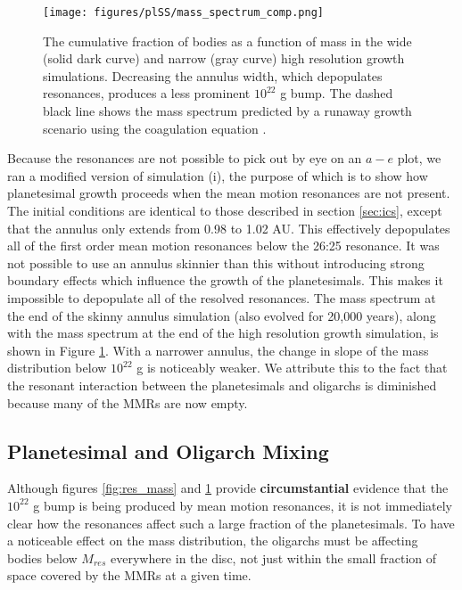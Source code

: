 \begin{figure}
    \begin{centering}
    \texttt{[image: figures/plSS/mass\_spectrum\_comp.png]}
    \caption{The cumulative fraction of bodies as a function of mass in the wide (solid dark curve) and narrow (gray curve) high 
    resolution growth simulations. Decreasing the annulus width, which depopulates resonances, produces a less prominent 
    $10^{22}$ g bump. The dashed black line shows the mass spectrum predicted  by a runaway growth scenario using the coagulation equation \cite{mcleod62, trubnikov71}.}
    \end{centering}
    \label{fig:mass_spectrum_comp}
\end{figure}
Because the resonances are not possible to pick out by eye on an $a-e$ plot, we ran a modified version of simulation (i), the 
purpose of which is to show how planetesimal growth proceeds when the mean motion resonances are not present. The initial 
conditions are identical to those described in section \ref{sec:ics}, except that the annulus only extends from 0.98 to 1.02 AU. 
This effectively depopulates all of the first order mean motion resonances below the 26:25 resonance. It was not possible to use 
an annulus skinnier than this without introducing strong boundary effects which influence the growth of the planetesimals. This 
makes it impossible to depopulate all of the resolved resonances. The mass spectrum at the end of the skinny annulus 
simulation (also evolved for 20,000 years), along with the mass spectrum at the end of the high resolution growth simulation, is 
shown in Figure \ref{fig:mass_spectrum_comp}. With a narrower annulus, the change in slope of the mass distribution below 
$10^{22}$ g is noticeably weaker. We attribute this to the fact that the resonant interaction between the planetesimals and 
oligarchs is diminished because many of the MMRs are now empty.

\subsection{Planetesimal and Oligarch Mixing}\label{sec:mix}

Although figures \ref{fig:res_mass} and \ref{fig:mass_spectrum_comp} provide \textbf{circumstantial} evidence that the $10^{22}$ g bump is 
being produced by mean motion resonances, it is not immediately clear how the resonances affect such a large fraction of the 
planetesimals. To have a noticeable effect on the mass distribution, the oligarchs must be affecting bodies below $M_{res}$ 
everywhere in the disc, not just within the small fraction of space covered by the MMRs at a given time.

